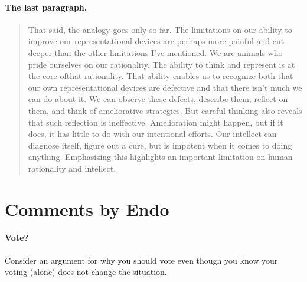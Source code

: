\documentclass[
10pt, %
a4paper, %
twocolumn, %
landscape %
]{article}
\begin{document}
\paragraph{The last paragraph.}
\begin{quotation}
  That said, the analogy goes only so far. The limitations on our ability to improve our representational devices are perhaps more painful and cut deeper than the other limitations I've mentioned. We are animals who pride ourselves on our rationality. The ability to think and represent is at the core ofthat rationality. That ability enables us to recognize both that our own representational devices are defective and that there isn't much we can do about it. We can observe these defects, describe them, reflect on them, and think of ameliorative strategies. But careful thinking also reveals that such reflection is ineffective. Amelioration might happen, but if it does, it has little to do with our intentional efforts. Our intellect can diagnose itself, figure out a cure, but is impotent when it comes to doing anything. Emphasizing this highlights an important limitation on human rationality and intellect.
\end{quotation}

\section*{Comments by Endo}
\paragraph{Vote?}
Consider an argument for why you should vote even though you know your voting (alone) does not change the situation.



\end{document}
